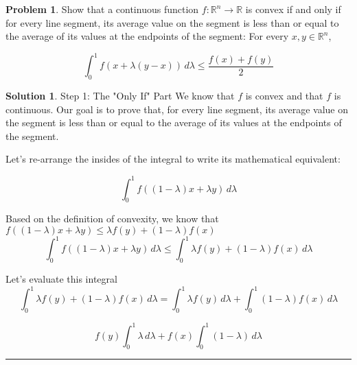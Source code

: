 \documentclass{article}
\theoremstyle{definition}
\newtheorem{problem}{Problem}
\def\fline{\rule{0.75\linewidth}{0.5pt}}
\newcommand{\finishline}{\begin{center}\fline\end{center}}
\newtheorem*{solution*}{Solution}
\newenvironment{solution}{\begin{solution*}}{{\finishline} \end{solution*}}
\begin{document}
\begin{problem}
    Show that a continuous function $f: \mathbb{R}^n \rightarrow \mathbb{R}$ is convex if and only if for every line segment, its average value on the segment is less than or equal to the average of its values at the endpoints of the segment: For every $x, y \in \mathbb{R}^n$,

    \begin{equation}
        \label{eq:example}
            \int_{0}^{1} f(x + \lambda(y - x)) \,d \lambda \leq \frac{f(x) + f(y)}{2}
    \end{equation}

    \begin{solution}
        Step 1: The "Only If" Part \newline 
        We know that $f$ is convex and that $f$ is continuous. Our goal is to prove that, for every line segment, its average value on the segment is less than or equal to the average of its values at the endpoints of the segment.  \newline 

        Let's re-arrange the insides of the integral to write its mathematical equivalent: \newline 

        \begin{equation}
        \label{eq:example}
            \int_{0}^{1} f((1 - \lambda)x + \lambda y) \,d \lambda
    \end{equation}

Based on the definition of convexity, we know that $f((1 - \lambda)x + \lambda y) \leq \lambda f(y) + (1 - \lambda) f(x)$
    \begin{equation}
        \label{eq:example}
            \int_{0}^{1} f((1 - \lambda)x + \lambda y) \,d \lambda \leq \int_{0}^{1} \lambda f(y) + (1 - \lambda) f(x) \,d \lambda
    \end{equation}

Let's evaluate this integral \newline 
\begin{equation}
        \label{eq:example}
            \int_{0}^{1} \lambda f(y) + (1 - \lambda) f(x) \,d \lambda =  \int_{0}^{1} \lambda f(y) \,d \lambda +  \int_{0}^{1} (1 - \lambda) f(x) \,d \lambda
    \end{equation}

    \begin{equation}
        \label{eq:example}
            f(y) \int_{0}^{1} \lambda \,d \lambda +  f(x) \int_{0}^{1} (1 - \lambda) \,d \lambda
    \end{equation}


\end{solution}
\end{problem}
\end{document}
